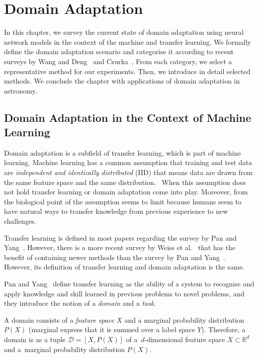 \chapter{Domain Adaptation}
\label{da_chapter}

In this chapter, we survey the current state of domain adaptation using neural network models
in the context of the machine and transfer learning.
We formally define the domain adaptation scenario
and categorise it according to recent surveys
by Wang and Deng~\cite{wang2018} and Csurka~\cite{csurka2017}.
From each category, we select a representative method for our experiments.
Then, we introduce in detail selected methods.
We conclude the chapter with applications of domain adaptation in astronomy.

\section{Domain Adaptation in the Context of Machine Learning}

Domain adaptation is a subfield of transfer learning,
which is part of machine learning.
Machine learning has a common assumption that training and test data are
\textit{independent and identically distributed} (IID)
that means data are drawn from the same feature space and the same distribution.~\cite{daume2006}
When this assumption does not hold transfer learning or domain adaptation come into play.
Moreover, from the biological point of the assumption seems to limit
because humans seem to have natural ways to transfer knowledge from previous experience to new challenges.~\cite{torrey2010}

Transfer learning is defined in most papers regarding the survey by Pan and Yang~\cite{pan2010}.
However, there is a more recent survey by Weiss et al.~\cite{weiss2016}
that has the benefit of containing newer methods than the survey by Pan and Yang~\cite{pan2010}.
However, its definition of transfer learning and domain adaptation is the same.

Pan and Yang~\cite{pan2010} define transfer learning
as the ability of a system to recognise and apply knowledge and skill
learned in previous problems to novel problems,
and they introduce the notion of a \textit{domain} and a \textit{task}.

A domain consists of a \textit{feature space} \(X\) and a marginal probability distribution \(P(X)\)
(marginal express that it is summed over a label space \(Y\)).
Therefore, a domain is as a tuple \(\mathcal{D} = [X, P(X)]\)
of a~\(d\)-dimensional feature space \(X \subset \mathbb{R}^d\)
and a~marginal probability distribution \(P(X)\).

